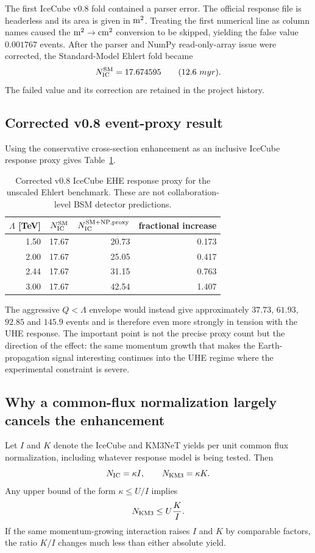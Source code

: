 \documentclass[11pt,a4paper]{article}
\begin{document}
The first IceCube v0.8 fold contained a parser error.  The official response
file is headerless and its area is given in ${\rm m}^2$.  Treating the first
numerical line as column names caused the ${\rm m}^2\to{\rm cm}^2$ conversion
to be skipped, yielding the false value $0.001767$ events.  After the parser
and NumPy read-only-array issue were corrected, the Standard-Model Ehlert fold
became
\begin{equation}
 N_{\rm IC}^{\rm SM}=17.674595
 \qquad(12.6\ {
m yr}).
 \label{eq:icsm}
\end{equation}
The failed value and its correction are retained in the project history.

\subsection{Corrected v0.8 event-proxy result}
Using the conservative cross-section enhancement as an inclusive IceCube
response proxy gives Table~\ref{tab:uheproxy}.

\begin{table}[t]
\centering
\caption{Corrected v0.8 IceCube EHE response proxy for the unscaled Ehlert
benchmark.  These are not collaboration-level BSM detector predictions.}
\label{tab:uheproxy}
\begin{tabular}{@{}rrrr@{}}
\toprule
$\Lambda$ [TeV] & $N_{\rm IC}^{\rm SM}$ &
$N_{\rm IC}^{\rm SM+NP,proxy}$ & fractional increase\\
\midrule
1.50 & 17.67 & 20.73 & 0.173\\
2.00 & 17.67 & 25.05 & 0.417\\
2.44 & 17.67 & 31.15 & 0.763\\
3.00 & 17.67 & 42.54 & 1.407\\
\bottomrule
\end{tabular}
\end{table}

The aggressive $Q<\Lambda$ envelope would instead give approximately
$37.73$, $61.93$, $92.85$ and $145.9$ events and is therefore even more
strongly in tension with the UHE response.  The important point is not the
precise proxy count but the direction of the effect: the same momentum growth
that makes the Earth-propagation signal interesting continues into the UHE
regime where the experimental constraint is severe.

\subsection{Why a common-flux normalization largely cancels the enhancement}
Let $I$ and $K$ denote the IceCube and KM3NeT yields per unit common flux
normalization, including whatever response model is being tested.  Then
\begin{equation}
 N_{\rm IC}=\kappa I,\qquad
 N_{\rm KM3}=\kappa K.
 \label{eq:commonflux}
\end{equation}
Any upper bound of the form $\kappa\le U/I$ implies
\begin{equation}
 N_{\rm KM3}\le U{K\over I}.
 \label{eq:ratioidentity}
\end{equation}
If the same momentum-growing interaction raises $I$ and $K$ by comparable
factors, the ratio $K/I$ changes much less than either absolute yield.
\end{document}
